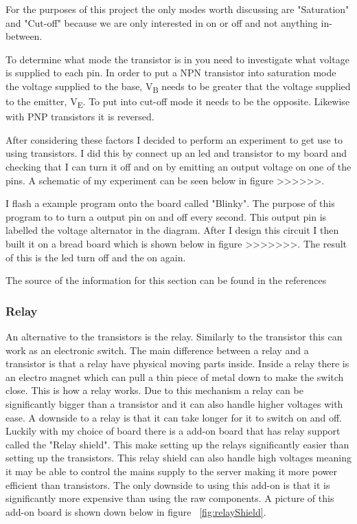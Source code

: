 \documentclass{article}
\begin{document}
For the purposes of this project the only modes worth discussing are "Saturation" and "Cut-off" because we
are only interested in on or off and not anything in-between.

To determine what mode the transistor is in you need to investigate what voltage is supplied to each pin.
In order to put a NPN transistor into saturation mode the voltage supplied to the base, V\textsubscript{B}
needs to be greater that the voltage supplied to the emitter, V\textsubscript{E}. To put into cut-off mode
it needs to be the opposite. Likewise with PNP transistors it is reversed.

After considering these factors I decided to perform an experiment to get use to using transistors. I did
this by connect up an led and transistor to my board and checking that I can turn it off and on by emitting
an output voltage on one of the pins. A schematic of my experiment can be seen below in figure >>>>>>.



I flash a example program onto the board called "Blinky". The purpose of this program to to turn a output
pin on and off every second. This output pin is labelled the voltage alternator in the diagram. After I
design this circuit I then built it on a bread board which is shown below in figure >>>>>>>. The result
of this is the led turn off and the on again.

The source of the information for this section can be found in the references \cite{transistor}

\subsubsection{Relay}

An alternative to the transistors is the relay. Similarly to the transistor this can work as an electronic
switch. The main difference between a relay and a transistor is that a relay have physical moving parts
inside. Inside a relay there is an electro magnet which can pull a thin piece of metal down to make the
switch close. This is how a relay works. Due to this mechanism a relay can be significantly bigger than
a transistor and it can also handle higher voltages with ease. A downside to a relay is that it can
take longer for it to switch on and off. Luckily with my choice of board there is a add-on board that has
relay support called the "Relay shield"\cite{relaySheild}. This make setting up the relays significantly easier than setting
up the transistors. This relay shield can also handle high voltages meaning it may be able to control the
mains supply to the server making it more power efficient than transistors. The only downside to using this
add-on is that it is significantly more expensive than using the raw components. A picture of this
add-on board is shown down below in figure ~\ref{fig:relayShield}.
\end{document}
